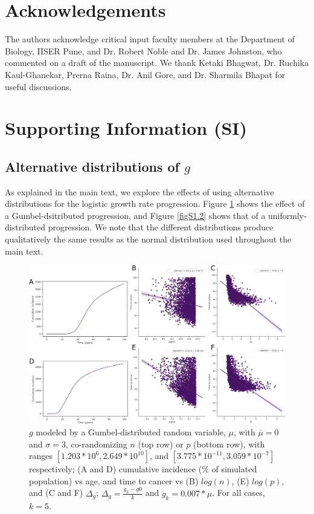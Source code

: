 \documentclass[10pt,twocolumn,twoside]{article}
\begin{document}
\section*{Acknowledgements}
The authors acknowledge critical input faculty members at the Department of Biology, IISER Pune, and Dr. Robert Noble and Dr. James Johnston, who commented on a draft of the manuscript. We thank Ketaki Bhagwat, Dr. Ruchika Kaul-Ghanekar, Prerna Raina, Dr. Anil Gore, and Dr. Sharmila Bhapat for useful discussions.

\newpage
\printbibliography


\section*{Supporting Information (SI)}
	\renewcommand{\thesubsection}{S\arabic{subsection}}
	\setcounter{subsection}{0} 	

	\subsection{Alternative distributions of $g$}\label{S1 Figures}
		As explained in the main text, we explore the effects of using alternative distributions for the logistic growth rate progression. Figure \ref{figS1.1} shows the effect of a Gumbel-dsitributed progression, and Figure \ref{figS1.2} shows that of a uniformly-distributed progression. We note that the different distributions produce qualitatively the same results as the normal distribution used throughout the main text.

		\renewcommand{\thefigure}{S1.\arabic{figure}}
		\setcounter{figure}{0} 	
		\begin{figure}[tbhp]
			\centering
			\includegraphics[width=\linewidth, keepaspectratio=true]{figS1-1.png}
			\caption{$g$ modeled by a Gumbel-distributed random variable, $\mu$, with $\overline{\mu}=0$ and $\sigma=3$, co-randomizing $n$ (top row) or $p$ (bottom row), with ranges $[1.203*10^{6}, 2.649*10^{10}]$, and $[3.775*10^{-11}, 3.059*10^{-7}]$ respectively; (A and D) cumulative incidence (\% of simulated population) vs age, and time to cancer vs (B) $log(n)$, (E) $log(p)$, and (C and F) $\Delta_{g}$; $\Delta_{g} = \frac{g_{k}-g{0}}{k}$ and $g_{k} = 0.007*\mu$. For all cases, $k=5$.}
			\label{figS1.1}
		\end{figure}
\end{document}
